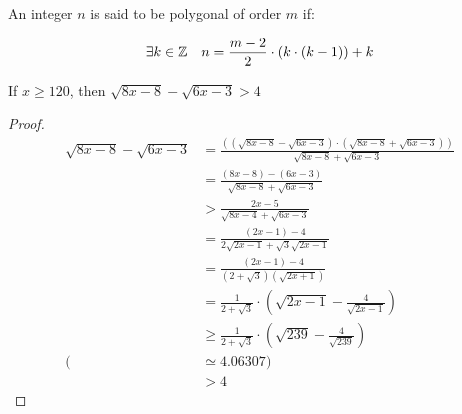 %

\begin{definition}
    \label{def:Polygonal}
    An integer $n$ is said to be polygonal of order $m$ if:

    \[
        \exists k \in \mathbb{Z} \quad n = \frac{m-2}{2}\cdot (k \cdot (k-1)) + k
    \]
\end{definition}

%
%

\begin{lemma}
    \label{lem:x120bound}
    If $x\geq 120$, then $\sqrt{8x-8}-\sqrt{6x-3}>4$
\end{lemma}

\begin{proof}
    \begin{align}
        \sqrt{8x-8}-\sqrt{6x-3} &= \frac{((\sqrt{8x-8}-\sqrt{6x-3})\cdot (\sqrt{8x-8}+\sqrt{6x-3}))}{\sqrt{8x-8}+\sqrt{6x-3}} \\
        &= \frac{(8x-8)-(6x-3)}{\sqrt{8x-8}+\sqrt{6x-3}} \\
        &> \frac{2x-5}{\sqrt{8x-4}+\sqrt{6x-3}} \\
        &= \frac{(2x-1)-4}{2\sqrt{2x-1}+\sqrt{3}\sqrt{2x-1}} \\
        &= \frac{(2x-1)-4}{(2+\sqrt{3})(\sqrt{2x+1})} \\
        &= \frac{1}{2+\sqrt{3}}\cdot \left(\sqrt{2x-1} - \frac{4}{\sqrt{2x-1}}\right) \\
        &\geq \frac{1}{2+\sqrt{3}}\cdot \left(\sqrt{239} - \frac{4}{\sqrt{239}}\right) \\
        (&\simeq 4.06307)\\
        &>4
    \end{align} 
\end{proof}

%
%

